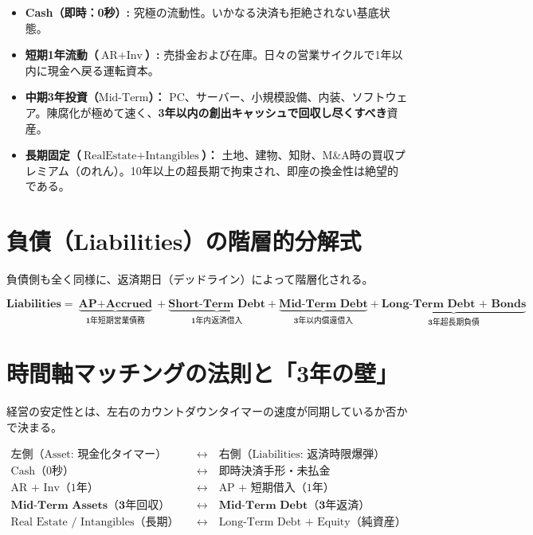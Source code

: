 \documentclass[11pt, a4paper]{report}
\begin{document}
\begin{itemize}
    \item \textbf{Cash（即時：0秒）:} 究極の流動性。いかなる決済も拒絶されない基底状態。
    \item \textbf{短期1年流動（$\text{AR} + \text{Inv}$）:} 売掛金および在庫。日々の営業サイクルで1年以内に現金へ戻る運転資本。
    \item \textbf{中期3年投資（$\text{Mid-Term}$）：} PC、サーバー、小規模設備、内装、ソフトウェア。陳腐化が極めて速く、\textbf{3年以内の創出キャッシュで回収し尽くすべき}資産。
    \item \textbf{長期固定（$\text{RealEstate} + \text{Intangibles}$）：} 土地、建物、知財、M\&A時の買収プレミアム（のれん）。10年以上の超長期で拘束され、即座の換金性は絶望的である。
\end{itemize}

\section{負債（Liabilities）の階層的分解式}

負債側も全く同様に、返済期日（デッドライン）によって階層化される。

\begin{equation}
    \mathbf{\text{Liabilities} = \underbrace{\text{AP} + \text{Accrued}}_{\text{1年短期営業債務}} + \underbrace{\text{Short-Term Debt}}_{\text{1年内返済借入}} + \underbrace{\text{Mid-Term Debt}}_{\text{3年以内償還借入}} + \underbrace{\text{Long-Term Debt + Bonds}}_{\text{3年超長期負債}}}
\end{equation}

\section{時間軸マッチングの法則と「3年の壁」}

経営の安定性とは、左右のカウントダウンタイマーの速度が同期しているか否かで決まる。

\begin{equation}
\begin{aligned}
\text{左側（Asset: 現金化タイマー）} &\quad \longleftrightarrow \quad \text{右側（Liabilities: 返済時限爆弾）} \\
\text{Cash（0秒）} &\quad \longleftrightarrow \quad \text{即時決済手形・未払金} \\
\text{AR + Inv（1年）} &\quad \longleftrightarrow \quad \text{AP + 短期借入（1年）} \\
\mathbf{\text{Mid-Term Assets（3年回収）}} &\quad \longleftrightarrow \quad \mathbf{\text{Mid-Term Debt（3年返済）}} \\
\text{Real Estate / Intangibles（長期）} &\quad \longleftrightarrow \quad \text{Long-Term Debt + Equity（純資産）}
\end{aligned}
\end{equation}
\end{document}
